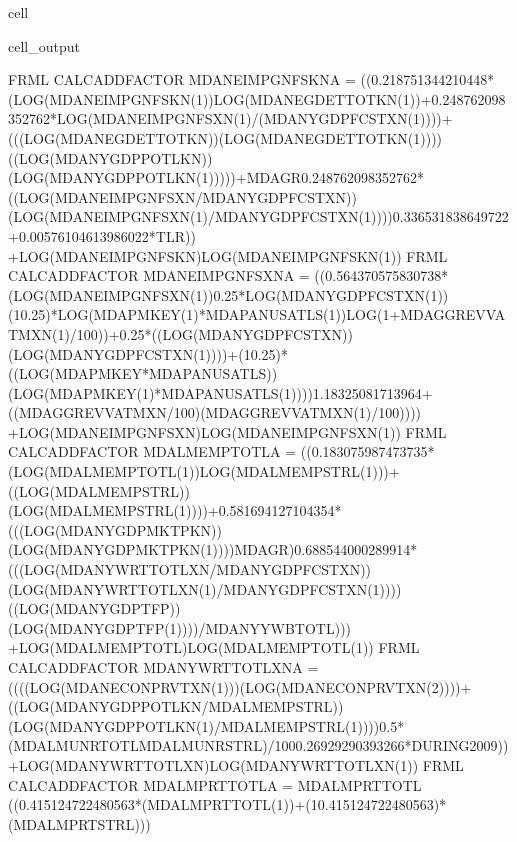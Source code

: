 \documentclass[letterpaper,10pt,english]{jupyterBook}
\begin{document}
\begin{sphinxuseclass}{cell}
\begin{sphinxVerbatimOutput}
\begin{sphinxuseclass}{cell_output}
\begin{sphinxVerbatim}[commandchars=\\\{\}]
FRML \PYGZlt{}CALC\PYGZus{}ADD\PYGZus{}FACTOR\PYGZgt{} MDANEIMPGNFSKN\PYGZus{}A = \PYGZhy{} ((\PYGZhy{}0.218751344210448*(LOG(MDANEIMPGNFSKN(\PYGZhy{}1))\PYGZhy{}LOG(MDANEGDETTOTKN(\PYGZhy{}1))+0.248762098352762*LOG(MDANEIMPGNFSXN(\PYGZhy{}1)/(MDANYGDPFCSTXN(\PYGZhy{}1))))+(((LOG(MDANEGDETTOTKN))\PYGZhy{}(LOG(MDANEGDETTOTKN(\PYGZhy{}1))))\PYGZhy{}((LOG(MDANYGDPPOTLKN))\PYGZhy{}(LOG(MDANYGDPPOTLKN(\PYGZhy{}1)))))+MDAGR\PYGZhy{}0.248762098352762*((LOG(MDANEIMPGNFSXN/MDANYGDPFCSTXN))\PYGZhy{}(LOG(MDANEIMPGNFSXN(\PYGZhy{}1)/MDANYGDPFCSTXN(\PYGZhy{}1))))\PYGZhy{}0.336531838649722+0.00576104613986022*T\PYGZus{}LR)) +LOG(MDANEIMPGNFSKN)\PYGZhy{}LOG(MDANEIMPGNFSKN(\PYGZhy{}1))\PYGZdl{}
FRML \PYGZlt{}CALC\PYGZus{}ADD\PYGZus{}FACTOR\PYGZgt{} MDANEIMPGNFSXN\PYGZus{}A = \PYGZhy{} ((\PYGZhy{}0.564370575830738*(LOG(MDANEIMPGNFSXN(\PYGZhy{}1))\PYGZhy{}0.25*LOG(MDANYGDPFCSTXN(\PYGZhy{}1))\PYGZhy{}(1\PYGZhy{}0.25)*LOG(MDAPMKEY(\PYGZhy{}1)*MDAPANUSATLS(\PYGZhy{}1))\PYGZhy{}LOG(1+MDAGGREVVATMXN(\PYGZhy{}1)/100))+0.25*((LOG(MDANYGDPFCSTXN))\PYGZhy{}(LOG(MDANYGDPFCSTXN(\PYGZhy{}1))))+(1\PYGZhy{}0.25)*((LOG(MDAPMKEY*MDAPANUSATLS))\PYGZhy{}(LOG(MDAPMKEY(\PYGZhy{}1)*MDAPANUSATLS(\PYGZhy{}1))))\PYGZhy{}1.18325081713964+((MDAGGREVVATMXN/100)\PYGZhy{}(MDAGGREVVATMXN(\PYGZhy{}1)/100)))) +LOG(MDANEIMPGNFSXN)\PYGZhy{}LOG(MDANEIMPGNFSXN(\PYGZhy{}1))\PYGZdl{}
FRML \PYGZlt{}CALC\PYGZus{}ADD\PYGZus{}FACTOR\PYGZgt{} MDALMEMPTOTL\PYGZus{}A = \PYGZhy{} ((\PYGZhy{}0.183075987473735*(LOG(MDALMEMPTOTL(\PYGZhy{}1))\PYGZhy{}LOG(MDALMEMPSTRL(\PYGZhy{}1)))+((LOG(MDALMEMPSTRL))\PYGZhy{}(LOG(MDALMEMPSTRL(\PYGZhy{}1))))+0.581694127104354*(((LOG(MDANYGDPMKTPKN))\PYGZhy{}(LOG(MDANYGDPMKTPKN(\PYGZhy{}1))))\PYGZhy{}MDAGR)\PYGZhy{}0.688544000289914*(((LOG(MDANYWRTTOTLXN/MDANYGDPFCSTXN))\PYGZhy{}(LOG(MDANYWRTTOTLXN(\PYGZhy{}1)/MDANYGDPFCSTXN(\PYGZhy{}1))))\PYGZhy{}((LOG(MDANYGDPTFP))\PYGZhy{}(LOG(MDANYGDPTFP(\PYGZhy{}1))))/MDANYYWBTOTL\PYGZus{}))) +LOG(MDALMEMPTOTL)\PYGZhy{}LOG(MDALMEMPTOTL(\PYGZhy{}1))\PYGZdl{}
FRML \PYGZlt{}CALC\PYGZus{}ADD\PYGZus{}FACTOR\PYGZgt{} MDANYWRTTOTLXN\PYGZus{}A = \PYGZhy{} ((((LOG(MDANECONPRVTXN(\PYGZhy{}1)))\PYGZhy{}(LOG(MDANECONPRVTXN(\PYGZhy{}2))))+((LOG(MDANYGDPPOTLKN/MDALMEMPSTRL))\PYGZhy{}(LOG(MDANYGDPPOTLKN(\PYGZhy{}1)/MDALMEMPSTRL(\PYGZhy{}1))))\PYGZhy{}0.5*(MDALMUNRTOTL\PYGZus{}\PYGZhy{}MDALMUNRSTRL\PYGZus{})/100\PYGZhy{}0.26929290393266*DURING\PYGZus{}2009)) +LOG(MDANYWRTTOTLXN)\PYGZhy{}LOG(MDANYWRTTOTLXN(\PYGZhy{}1))\PYGZdl{}
FRML \PYGZlt{}CALC\PYGZus{}ADD\PYGZus{}FACTOR\PYGZgt{} MDALMPRTTOTL\PYGZus{}\PYGZus{}A = MDALMPRTTOTL\PYGZus{}\PYGZhy{} ((0.415124722480563*(MDALMPRTTOTL\PYGZus{}(\PYGZhy{}1))+(1\PYGZhy{}0.415124722480563)*(MDALMPRTSTRL\PYGZus{}))) \PYGZdl{}

\end{sphinxVerbatim}
\end{sphinxuseclass}
\end{sphinxVerbatimOutput}
\end{sphinxuseclass}
\end{document}
